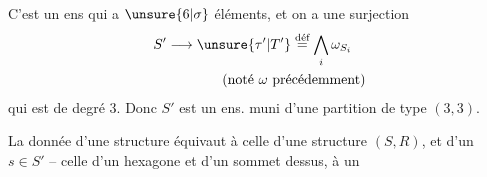 C'est un ens qui a $\unsure{6|\sigma}$ éléments, et on a une  surjection
\[
\begin{aligned}
S'&\longrightarrow\unsure{\tau'|T'}\overset{\text{déf}}{=}\bigwedge_i\omega_{S_i}\\
&\hspace{4em}\text{(noté $\omega$ précédemment)}
\end{aligned}
\]
qui est de degré $3$. Donc $S'$ est  un ens. muni d'une partition de type $(3,3)$.

La donnée d'une structure  équivaut à celle d'une structure $(S,R)$, et d'un $s\in S'$ -- celle d'un hexagone et d'un sommet dessus, à un


